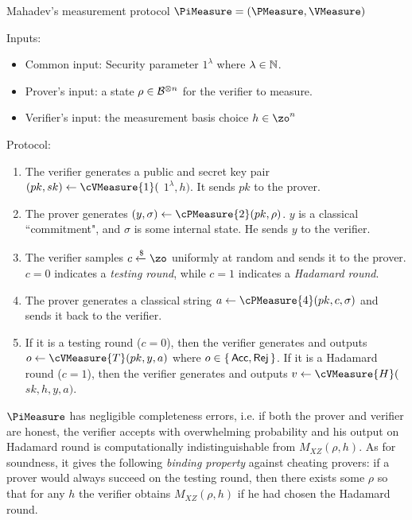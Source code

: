 \begin{protocol}{Mahadev's measurement protocol $\PiMeasure=(\PMeasure, \VMeasure)$}
	\label{proto:urmila4}

	Inputs:
	\begin{itemize}
		\item Common input: Security parameter $1^\lambda$ where $\lambda\in\mathbb{N}$.
		\item Prover's input: a state $\rho\in\mathcal{B}^{\otimes n}$ for the verifier to measure.
		\item Verifier's input: the measurement basis choice $h \in \zo^n$
	\end{itemize}

	Protocol:
	\begin{enumerate}
		\item \label{step:measure1} The verifier generates a public and secret key pair $(pk, sk)\leftarrow\cVMeasure{1}($ $1^\lambda, h)$. It sends $pk$ to the prover.
		\item \label{step:measure2} The prover generates $(y, \sigma)\leftarrow\cPMeasure{2}(pk, \rho)$.
			$y$ is a classical ``commitment", and $\sigma$ is some internal state.
			He sends $y$ to the verifier.
		\item \label{step:measure3} The verifier samples $c\xleftarrow{\$}\zo$ uniformly at random and sends it to the prover. $c=0$ indicates a \emph{testing round}, while $c=1$ indicates a \emph{Hadamard round}.
		\item \label{step:measure4} The prover generates a classical string $a\leftarrow\cPMeasure{4}(pk, c, \sigma)$ and sends it back to the verifier.
		\item \label{step:output} If it is a testing round ($c=0$), then the verifier generates and outputs $o\leftarrow\cVMeasure{T}(pk, y, a)$ where $o\in\set{\mathsf{Acc}, \mathsf{Rej}}$.
			If it is a Hadamard round ($c=1$), then the verifier generates and outputs $v\leftarrow\cVMeasure{H}($ $sk, h, y, a)$.
	\end{enumerate}
\end{protocol}

$\PiMeasure$ has negligible completeness errors, i.e. if both the prover and verifier are honest, the verifier accepts with overwhelming probability and his output on Hadamard round is computationally indistinguishable from $M_{XZ}(\rho, h)$. As for soundness,
it gives the following \emph{binding property} against cheating provers:
if a prover would always succeed on the testing round, then there exists some $\rho$ so that for any $h$ the verifier obtains $M_{XZ}(\rho, h)$ if he had chosen the Hadamard round.

